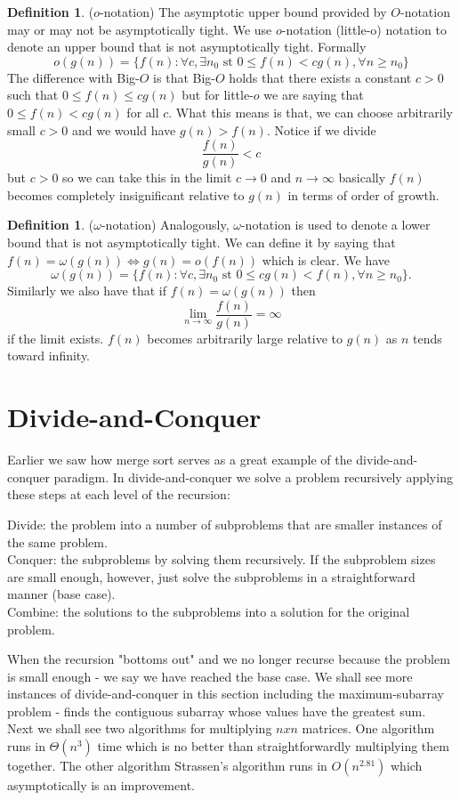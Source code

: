 \documentclass{scrartcl}
\theoremstyle{definition}
\theoremstyle{definition}
\newtheorem{definition}[theorem]{Definition}
\theoremstyle{remark}
\numberwithin{equation}{section}
\begin{document}
\begin{definition}($o$-notation)
    The asymptotic upper bound provided by $O$-notation may or may not be asymptotically tight. We use $o$-notation (little-o) notation to denote an upper bound that is not asymptotically tight. Formally
    $$o(g(n))=\{f(n):\forall c,\exists n_0\text{ st }0\leq f(n)<cg(n),\forall n\geq n_0\}$$
    The difference with Big-$O$ is that Big-$O$ holds that there exists a constant $c>0$ such that $0\leq f(n)\leq cg(n)$ but for little-$o$ we are saying that $0\leq f(n)<cg(n)$ for all $c$. What this means is that, we can choose arbitrarily small $c>0$ and we would have $g(n)>f(n)$. Notice if we divide
    $$\frac{f(n)}{g(n)}<c$$ but $c>0$ so we can take this in the limit $c\rightarrow0$ and $n\rightarrow\infty$ basically $f(n)$ becomes completely insignificant relative to $g(n)$ in terms of order of growth.
\end{definition}
\begin{definition}($\omega$-notation)
    Analogously, $\omega$-notation is used to denote a lower bound that is not asymptotically tight. We can define it by saying that $f(n)=\omega(g(n))\iff g(n)=o(f(n))$ which is clear. We have
    $$\omega(g(n))=\{f(n):\forall c,\exists n_0\text{ st }0\leq cg(n)<f(n),\forall n\geq n_0\}.$$
    Similarly we also have that if $f(n)=\omega(g(n))$ then $$\lim_{n\rightarrow\infty}\frac{f(n)}{g(n)}=\infty$$
    if the limit exists. $f(n)$ becomes arbitrarily large relative to $g(n)$ as $n$ tends toward infinity. 
\end{definition}
\section{Divide-and-Conquer}
Earlier we saw how merge sort serves as a great example of the divide-and-conquer paradigm. In divide-and-conquer we solve a problem recursively applying these steps at each level of the recursion:\\
\begin{itemize}
    Divide: the problem into a number of subproblems that are smaller instances of the same problem.\\
    Conquer: the subproblems by solving them recursively. If the subproblem sizes are small enough, however, just solve the subproblems in a straightforward manner (base case).\\
    Combine: the solutions to the subproblems into a solution for the original problem.
\end{itemize}
When the recursion "bottoms out" and we no longer recurse because the problem is small enough - we say we have reached the base case. We shall see more instances of divide-and-conquer in this section including the maximum-subarray problem - finds the contiguous subarray whose values have the greatest sum. Next we shall see two algorithms for multiplying $nxn$ matrices. One algorithm runs in $\Theta(n^3)$ time which is no better than straightforwardly multiplying them together. The other algorithm Strassen's algorithm runs in $O(n^{2.81})$ which asymptotically is an improvement.  
\end{document}
